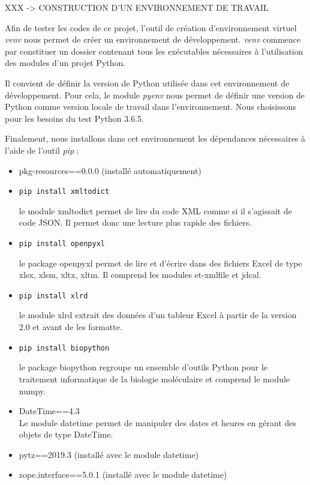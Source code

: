 \documentclass[twoside,a4paper,11pt,frenchb,openany]{report}
\begin{document}
 XXX -> CONSTRUCTION D'UN ENVIRONNEMENT DE TRAVAIL

Afin de tester les codes de ce projet, l'outil de création d'environnement virtuel \textit{venv}  nous permet de créer un environnement de développement. \textit{venv} commence par constituer un dossier contenant tous les exécutables nécessaires à l'utilisation des modules d'un projet Python.

Il convient de définir la version de Python utilisée dans cet environnement de développement. Pour cela, le module \textit{pyenv}  nous permet de définir une version de Python comme version locale de travail dans l'environnement. Nous choisissons pour les besoins du test Python 3.6.5.

Finalement, nous installons dans cet environnement les dépendances nécessaires à l'aide de l'outil \textit{pip}  :
\begin{itemize}
\item pkg-resources==0.0.0 (installé automatiquement)
\item \begin{tcolorbox}\texttt{pip install xmltodict}\end{tcolorbox}
le module xmltodict permet de lire du code XML comme si il s'agissait de code JSON. Il permet donc une lecture plus rapide des fichiers.
\item  \begin{tcolorbox}\texttt{pip install openpyxl}\end{tcolorbox}
le package openpyxl permet de lire et d'écrire dans des fichiers Excel de type xlsx, xlsm, xltx, xltm. Il comprend les modules et-xmlfile et jdcal.
\item  \begin{tcolorbox}\texttt{pip install xlrd}\end{tcolorbox}
le module xlrd extrait des données d'un tableur Excel à partir de la version 2.0 et avant de les formatte.
\item  \begin{tcolorbox}\texttt{pip install biopython}\end{tcolorbox}
le package biopython regroupe un ensemble d'outils Python pour le traitement informatique de la biologie moléculaire et comprend le module numpy.
\item DateTime==4.3\\
Le module datetime permet de manipuler des dates et heures en gérant des objets de type DateTime. 
\item pytz==2019.3 (installé avec le module datetime)
\item zope.interface==5.0.1 (installé avec le module datetime)
\end{itemize}
\end{document}
